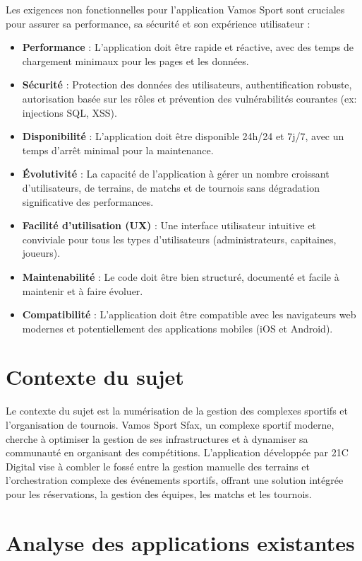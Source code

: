 \documentclass{article}
\begin{document}
Les exigences non fonctionnelles pour l'application Vamos Sport sont cruciales pour assurer sa performance, sa sécurité et son expérience utilisateur :
\begin{itemize}
    \item \textbf{Performance} : L'application doit être rapide et réactive, avec des temps de chargement minimaux pour les pages et les données.
    \item \textbf{Sécurité} : Protection des données des utilisateurs, authentification robuste, autorisation basée sur les rôles et prévention des vulnérabilités courantes (ex: injections SQL, XSS).
    \item \textbf{Disponibilité} : L'application doit être disponible 24h/24 et 7j/7, avec un temps d'arrêt minimal pour la maintenance.
    \item \textbf{Évolutivité} : La capacité de l'application à gérer un nombre croissant d'utilisateurs, de terrains, de matchs et de tournois sans dégradation significative des performances.
    \item \textbf{Facilité d'utilisation (UX)} : Une interface utilisateur intuitive et conviviale pour tous les types d'utilisateurs (administrateurs, capitaines, joueurs).
    \item \textbf{Maintenabilité} : Le code doit être bien structuré, documenté et facile à maintenir et à faire évoluer.
    \item \textbf{Compatibilité} : L'application doit être compatible avec les navigateurs web modernes et potentiellement des applications mobiles (iOS et Android).
\end{itemize}

\section{Contexte du sujet}

Le contexte du sujet est la numérisation de la gestion des complexes sportifs et l'organisation de tournois. Vamos Sport Sfax, un complexe sportif moderne, cherche à optimiser la gestion de ses infrastructures et à dynamiser sa communauté en organisant des compétitions. L'application développée par 21C Digital vise à combler le fossé entre la gestion manuelle des terrains et l'orchestration complexe des événements sportifs, offrant une solution intégrée pour les réservations, la gestion des équipes, les matchs et les tournois.

\section{Analyse des applications existantes}
\end{document}
